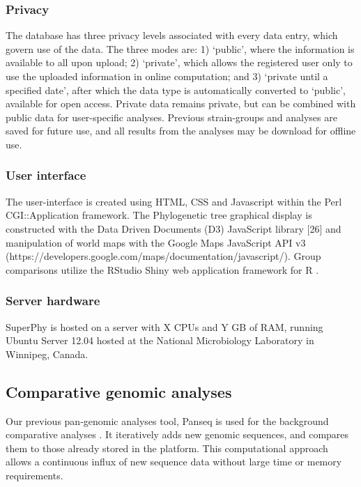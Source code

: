 \documentclass{bmcart}
\begin{document}
\subsubsection{Privacy}
The database has three privacy levels associated with every data entry, which govern use of the data. The three modes are: 1) `public', where the information is available to all upon upload; 2) `private', which allows the registered user only to use the uploaded information in online computation; and 3) `private until a specified date', after which the data type is automatically converted to `public', available for open access. Private data remains private, but can be combined with public data for user-specific analyses. Previous strain-groups and analyses are saved for future use, and all results from the analyses may be download for offline use.

\subsubsection{User interface}
The user-interface is created using HTML, CSS and Javascript within the Perl CGI::Application framework. The Phylogenetic tree graphical display is constructed with the Data Driven Documents (D3) JavaScript library [26] and manipulation of world maps with the Google Maps JavaScript API v3 (https://developers.google.com/maps/documentation/javascript/). Group comparisons utilize the RStudio Shiny web application framework for R \cite{}.

\subsubsection{Server hardware}
SuperPhy is hosted on a server with X CPUs and Y GB of RAM, running Ubuntu Server 12.04 hosted at the National Microbiology Laboratory in Winnipeg, Canada.


\subsection{Comparative genomic analyses}
Our previous pan-genomic analyses tool, Panseq is used for the background comparative analyses \cite{laing_pan-genome_2010}. It iteratively adds new genomic sequences, and compares them to those already stored in the platform. This computational approach allows a continuous influx of new sequence data without large time or memory requirements. 
\end{document}
